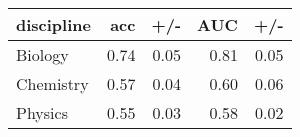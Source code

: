\begin{tabular}{lrr||rr}
\toprule
discipline &   acc &   +/- &   AUC &   +/- \\
\midrule
   Biology &  0.74 &  0.05 &  0.81 &  0.05 \\
 Chemistry &  0.57 &  0.04 &  0.60 &  0.06 \\
   Physics &  0.55 &  0.03 &  0.58 &  0.02 \\
\bottomrule
\end{tabular}
